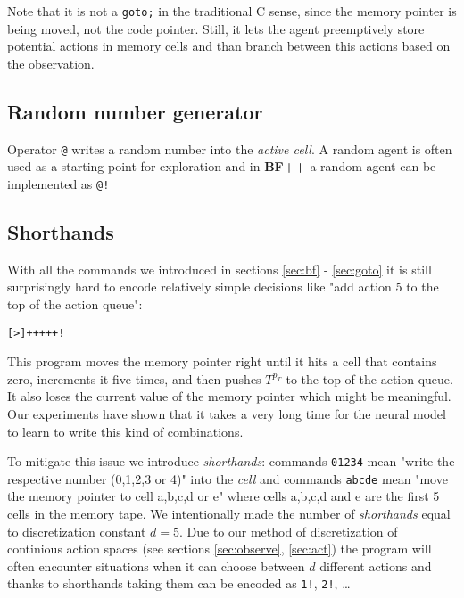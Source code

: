 Note that it is not a \texttt{goto;} in the traditional C sense, since the memory pointer is being moved, not the code pointer.
Still, it lets the agent preemptively store potential actions in memory cells and than branch between this actions based on the observation.

\subsection{Random number generator}
\label{sec:random}

Operator \texttt{@} writes a random number into the \textit{active cell}.
A random agent is often used as a starting point for exploration and in \textbf{BF++} a random agent can be implemented as \verb|@!|

\subsection{Shorthands}
\label{sec:shorthands}

With all the commands we introduced in sections \ref{sec:bf} - \ref{sec:goto} it is still surprisingly hard to encode relatively simple decisions like "add action 5 to the top of the action queue":

\begin{center}
\begin{lstlisting}
[>]+++++!
\end{lstlisting}
\end{center}

This program moves the memory pointer right until it hits a cell that contains zero, increments it five times, and then pushes $T^{p_T}$ to the top of the action queue. It also loses the current value of the memory pointer which might be meaningful. Our experiments have shown that it takes a very long time for the neural model to learn to write this kind of combinations.

To mitigate this issue we introduce \textit{shorthands}: commands \texttt{01234} mean "write the respective number (0,1,2,3 or 4)" into the \textit{cell} and commands \texttt{abcde} mean "move the memory pointer to cell a,b,c,d or e" where cells a,b,c,d and e are the first 5 cells in the memory tape.
We intentionally made the number of \textit{shorthands} equal to discretization constant $d=5$.
Due to our method of discretization of continious action spaces (see sections \ref{sec:observe}, \ref{sec:act}) the program will often encounter situations when it can choose between $d$ different actions and thanks to shorthands taking them can be encoded as \texttt{1!}, \texttt{2!}, \dots


